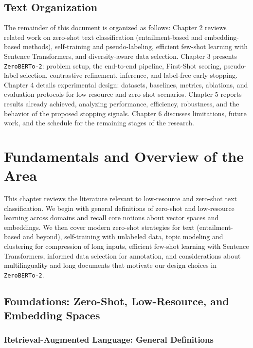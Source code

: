 \documentclass[]{politex-xico}
\begin{document}
\section{Text Organization}
\label{sec:text_organization}

The remainder of this document is organized as follows: Chapter 2 reviews related work on zero-shot text classification (entailment-based and embedding-based methods), self-training and pseudo-labeling, efficient few-shot learning with Sentence Transformers, and diversity-aware data selection.
Chapter 3 presents \texttt{ZeroBERTo-2}: problem setup, the end-to-end pipeline, First-Shot scoring, pseudo-label selection, contrastive refinement, inference, and label-free early stopping.
Chapter 4 details experimental design: datasets, baselines, metrics, ablations, and evaluation protocols for low-resource and zero-shot scenarios.
Chapter 5 reports results already achieved, analyzing performance, efficiency, robustness, and the behavior of the proposed stopping signals.
Chapter 6 discusses limitations, future work, and the schedule for the remaining stages of the research.


\chapter{Fundamentals and Overview of the Area}
\label{chapter:review}

This chapter reviews the literature relevant to low-resource and zero-shot text classification. We begin with general definitions of zero-shot and low-resource learning across domains and recall core notions about vector spaces and embeddings. We then cover modern zero-shot strategies for text (entailment-based and beyond), self-training with unlabeled data, topic modeling and clustering for compression of long inputs, efficient few-shot learning with Sentence Transformers, informed data selection for annotation, and considerations about multilinguality and long documents that motivate our design choices in \texttt{ZeroBERTo-2}.

\section{Foundations: Zero-Shot, Low-Resource, and Embedding Spaces}
\label{sec:foundations}

\subsection{Retrieval-Augmented Language: General Definitions}
\end{document}
